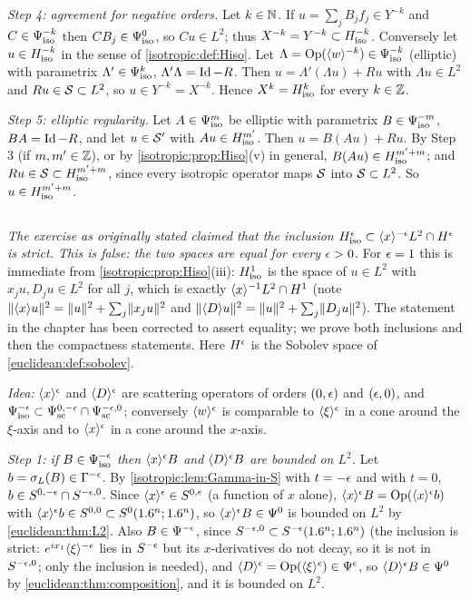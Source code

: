 \emph{Step 4: agreement for negative orders.} Let $k\in\mathbb{N}$. If $u=\sum_jB_jf_j\in Y^{-k}$
and $C\in\Psi^{-k}_{\mathrm{iso}}$ then $CB_j\in\Psi^{0}_{\mathrm{iso}}$, so $Cu\in L^2$; thus
$X^{-k}=Y^{-k}\subset H^{-k}_{\mathrm{iso}}$. Conversely let $u\in H^{-k}_{\mathrm{iso}}$ in the sense of
\cref{isotropic:def:Hiso}. Let $\Lambda=\operatorname{Op}(\langle w\rangle^{-k})\in\Psi^{-k}_{\mathrm{iso}}$ (elliptic)
with parametrix $\Lambda'\in\Psi^{k}_{\mathrm{iso}}$, $\Lambda'\Lambda=\operatorname{Id}-R$. Then
$u=\Lambda'(\Lambda u)+Ru$ with $\Lambda u\in L^2$ and $Ru\in\mathcal{S}\subset L^2$,
so $u\in Y^{-k}=X^{-k}$. Hence $X^k=H^{k}_{\mathrm{iso}}$ for every $k\in\mathbb{Z}$.

\emph{Step 5: elliptic regularity.} Let $A\in\Psi^{m}_{\mathrm{iso}}$ be elliptic with
parametrix $B\in\Psi^{-m}_{\mathrm{iso}}$, $BA=\operatorname{Id}-R$, and let $u\in\mathcal{S}'$ with
$Au\in H^{m'}_{\mathrm{iso}}$. Then $u=B(Au)+Ru$. By Step 3 (if $m,m'\in\mathbb{Z}$), or by
\cref{isotropic:prop:Hiso}(v) in general, $B(Au)\in H^{m'+m}_{\mathrm{iso}}$; and
$Ru\in\mathcal{S}\subset H^{m'+m}_{\mathrm{iso}}$, since every isotropic operator maps $\mathcal{S}$ into
$\mathcal{S}\subset L^2$. So $u\in H^{m'+m}_{\mathrm{iso}}$.

\subsection*{}

\emph{The exercise as originally stated claimed that the inclusion
$H^{\epsilon}_{\mathrm{iso}}\subset\langle x\rangle^{-\epsilon}L^2\cap H^\epsilon$ is strict. This is false: the
two spaces are equal for every $\epsilon>0$.} For $\epsilon=1$ this is immediate from
\cref{isotropic:prop:Hiso}(iii): $H^{1}_{\mathrm{iso}}$ is the space of $u\in L^2$ with
$x_ju,D_ju\in L^2$ for all $j$, which is exactly
$\langle x\rangle^{-1}L^2\cap H^1$ (note $\lVert \langle x\rangle u\rVert^2=\lVert u\rVert^2+\sum_j\lVert x_ju\rVert^2$ and
$\lVert \langle D\rangle u\rVert^2=\lVert u\rVert^2+\sum_j\lVert D_ju\rVert^2$). The statement in the chapter has
been corrected to assert equality; we prove both inclusions and then the
compactness statements. Here $H^\epsilon$ is the Sobolev space of
\cref{euclidean:def:sobolev}.

\emph{Idea:} $\langle x\rangle^\epsilon$ and $\langle D\rangle^\epsilon$ are scattering operators of orders
$(0,\epsilon)$ and $(\epsilon,0)$, and $\Psi^{-\epsilon}_{\mathrm{iso}}\subset\Psi^{0,-\epsilon}_{\mathrm{sc}}\cap\Psi^{-\epsilon,0}_{\mathrm{sc}}$;
conversely $\langle w\rangle^\epsilon$ is comparable to $\langle \xi\rangle^\epsilon$ in a cone around the
$\xi$-axis and to $\langle x\rangle^\epsilon$ in a cone around the $x$-axis.

\emph{Step 1: if $B\in\Psi^{-\epsilon}_{\mathrm{iso}}$ then $\langle x\rangle^\epsilon B$ and $\langle D\rangle^\epsilon B$
are bounded on $L^2$.} Let $b=\sigma_L(B)\in\Gamma^{-\epsilon}$. By
\cref{isotropic:lem:Gamma-in-S} with $t=-\epsilon$ and with $t=0$,
$b\in S^{0,-\epsilon}\cap S^{-\epsilon,0}$. Since $\langle x\rangle^\epsilon\in S^{0,\epsilon}$ (a function
of $x$ alone), $\langle x\rangle^\epsilon B=\operatorname{Op}(\langle x\rangle^\epsilon b)$ with
$\langle x\rangle^\epsilon b\in S^{0,0}\subset S^0(1.6^n;1.6^n)$, so $\langle x\rangle^\epsilon B\in\Psi^{0}$ is
bounded on $L^2$ by \cref{euclidean:thm:L2}. Also $B\in\Psi^{-\epsilon}$, since
$S^{-\epsilon,0}\subset S^{-\epsilon}(1.6^n;1.6^n)$ (the inclusion is strict: $e^{ix_1}\langle \xi\rangle^{-\epsilon}$
lies in $S^{-\epsilon}$ but its $x$-derivatives do not decay, so it is not in
$S^{-\epsilon,0}$; only the inclusion is needed), and $\langle D\rangle^\epsilon=\operatorname{Op}(\langle \xi\rangle^\epsilon)\in\Psi^{\epsilon}$, so
$\langle D\rangle^\epsilon B\in\Psi^{0}$ by \cref{euclidean:thm:composition}, and it is
bounded on $L^2$.

